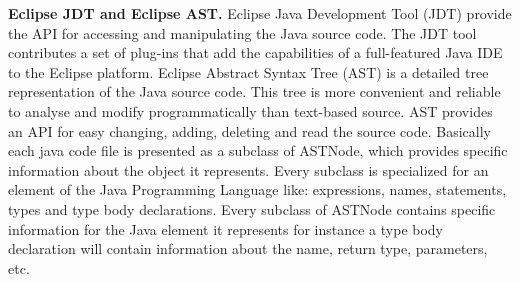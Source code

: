 \textbf{Eclipse JDT and Eclipse AST.} Eclipse Java Development Tool (JDT) \cite{jdt} provide the API for accessing and manipulating the Java source code. The JDT tool contributes a set of plug-ins that add the capabilities of a full-featured Java IDE to the Eclipse platform. Eclipse Abstract Syntax Tree (AST) \cite{ast} is a detailed tree representation of the Java source code. This tree is more convenient and reliable to analyse and modify programmatically than text-based source. AST provides an API for easy changing, adding, deleting and read the source code. Basically each java code file is presented as a subclass of ASTNode, which provides specific information about the object it represents. Every subclass is specialized for an element of the Java Programming Language like: expressions, names, statements, types and type body declarations. Every subclass of ASTNode contains specific information for the Java element it represents for instance a type body declaration will contain information about the name, return type, parameters, etc.

